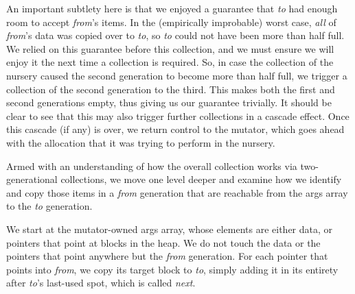 An important subtlety here is that we enjoyed a 
guarantee that \emph{to} had enough room to accept 
\emph{from}'s items. In the (empirically improbable) worst case, 
\emph{all} of \emph{from}'s data was copied over to \emph{to}, 
so \emph{to} could not have been more than 
half full. We relied on this guarantee before this collection, 
and we must ensure we will enjoy it the next time a collection 
is required. So, in case the collection of the nursery caused
the second generation to become more than half full, we trigger
a collection of the second generation to the third. This makes 
both the first and second generations empty, thus giving us our 
guarantee trivially. It should be 
clear to see that this may also trigger further collections in 
a cascade effect. Once this cascade (if any) is over, we
return control to the mutator, which goes ahead with 
the allocation that it was trying to perform in the nursery.

Armed with an understanding of how the overall collection 
works via two-generational collections, we move one 
level deeper and examine how we identify and 
copy those items in a \emph{from} generation that are reachable
from the args array to the \emph{to} generation.


We start at the mutator-owned args array, whose elements
are either data, or pointers that point at blocks in the 
heap. We do not touch the data or the pointers that point
anywhere but the \emph{from} generation. 
For each pointer that points into \emph{from}, we copy its
target block to \emph{to}, simply adding it in its entirety 
after \emph{to}'s last-used spot, which is called \emph{next}. 

